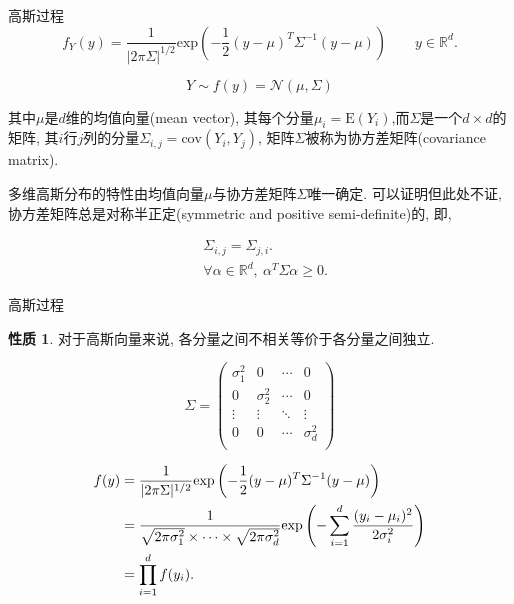 \documentclass[10pt,mathserif]{beamer}
\theoremstyle{definition}
\newtheorem{property}{性质}[section] %
\numberwithin{equation}{section} %
\begin{document}
    \begin{frame}[fragile]{高斯过程}
        \begin{equation*}
            f_{Y}(y)=\frac{1}{|2\pi\Sigma|^{1/2}}\mathrm{exp}\left(-\frac{1}{2}(y-\mu)^{T}\Sigma^{-1}(y-\mu)\right) \qquad y\in\mathds{R}^{d}. 
        \end{equation*}

        \begin{equation*}
            Y \sim f(y)=\mathcal{N}(\mu, \Sigma)
        \end{equation*}

        其中$\mu$是$d$维的均值向量(mean vector), 其每个分量$\mu_{i}=\mathrm{E}(Y_{i})$,而$\Sigma$是一个$d\times d$的矩阵, 其$i$行$j$列的分量$\Sigma_{i,j}=\mathrm{cov}(Y_{i},Y_{j})$, 矩阵$\Sigma$被称为协方差矩阵(covariance matrix).

        多维高斯分布的特性由均值向量$\mu$与协方差矩阵$\Sigma$唯一确定. 可以证明但此处不证, 协方差矩阵总是对称半正定(symmetric and positive semi-definite)的, 即,

        \begin{align}
            &\Sigma_{i,j}=\Sigma_{j,i}. \\
            &\forall\alpha\in\mathds{R}^{d},\ \alpha^{T}\Sigma\alpha\geqslant 0.
        \end{align}
    \end{frame}

    \begin{frame}[fragile]{高斯过程}
        \begin{property}
            对于高斯向量来说, 各分量之间不相关等价于各分量之间独立.
        \end{property}

        \begin{equation}
            \Sigma= \begin{pmatrix}
                        \sigma^{2}_{1} & 0 & \cdots & 0 \\
                        0 & \sigma^{2}_{2} & \cdots & 0 \\ 
                        \vdots & \vdots & \ddots & \vdots \\
                        0 & 0 & \cdots & \sigma^{2}_{d} \\
                    \end{pmatrix}
        \end{equation}

        \begin{align}
            f(y)&=\frac{1}{|2\pi\Sigma|^{1/2}}\mathrm{exp}\left(-\frac{1}{2}(y-\mu)^{T}\Sigma^{-1}(y-\mu)\right) \notag \\
            &=\frac{1}{\sqrt{2\pi\sigma^{2}_{1}}\times \dots\times\sqrt{2\pi\sigma^{2}_{d}}} \mathrm{exp}\left(-\sum^{d}_{i=1}\frac{(y_{i}-\mu_{i})^{2}}{2\sigma^{2}_{i}}\right) \notag \\
            &=\prod^{d}_{i=1}f(y_{i}).
        \end{align}    

    \end{frame}
\end{document}
